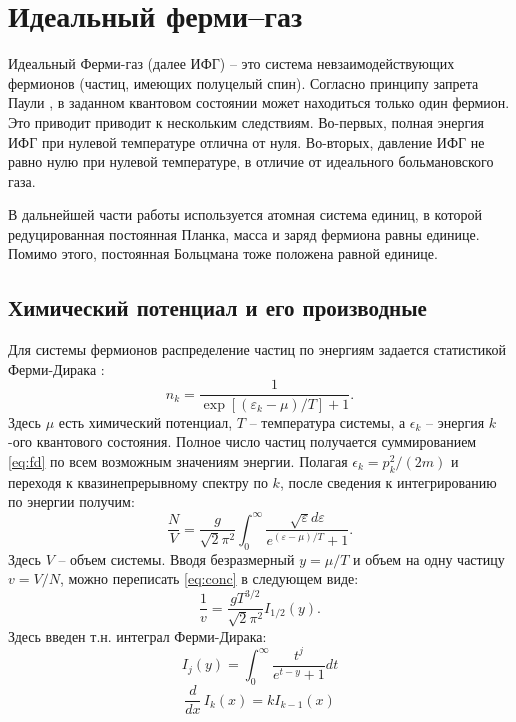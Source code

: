 \chapter{Идеальный ферми--газ}
Идеальный Ферми-газ (далее ИФГ) -- это система невзаимодействующих фермионов (частиц, имеющих полуцелый спин).
Согласно принципу запрета Паули \cite{Pauli:ZP:1925,Pauli:PR:1940}, в заданном квантовом состоянии может находиться только один фермион.
Это приводит приводит к нескольким следствиям.
Во-первых, полная энергия ИФГ при нулевой температуре отлична от нуля.
Во-вторых, давление ИФГ не равно нулю при нулевой температуре, в отличие от идеального больмановского газа.

В дальнейшей части работы используется атомная система единиц, в которой редуцированная постоянная Планка, масса и заряд фермиона равны единице.
Помимо этого, постоянная Больцмана тоже положена равной единице.

\section{Химический потенциал и его производные}
Для системы фермионов распределение частиц по энергиям задается статистикой Ферми-Дирака \cite{Landau:statmech:1958}:
\begin{equation}
    n_k = \frac{1}{\exp{[(\varepsilon_k - \mu)/T]} + 1}.
    \label{eq:fd}
\end{equation}
Здесь $\mu$ есть химический потенциал, $T$ -- температура системы, а $\epsilon_k$ -- энергия $k$-ого квантового состояния. 
Полное число частиц получается суммированием \eqref{eq:fd} по всем возможным значениям энергии.
Полагая $\epsilon_k = p^2_{k} / (2m)$ и переходя к квазинепрерывному спектру по $k$, после сведения к интегрированию по энергии получим:
\begin{equation}
    \label{eq:conc}
    \frac{N}{V}=\frac{g}{\sqrt{2} \pi^{2}} \int_{0}^{\infty} \frac{\sqrt{\varepsilon} d \varepsilon}{e^{(\varepsilon-\mu) / T}+1}.
\end{equation}
Здесь $V$ -- объем системы.
Вводя безразмерный $y = \mu / T$ и объем на одну частицу $v = V / N$, можно переписать \eqref{eq:conc} в следующем виде:
\begin{equation}
    \frac{1}{v} = \frac{g T^{3/2}}{\sqrt{2}\pi^2}I_{1/2}(y).
    \label{eq:mu_equation}
\end{equation}
Здесь введен т.н. интеграл Ферми-Дирака:
\begin{equation}
    \label{eq:fermi-dirak_integral_definition}
    I_{j}(y)= \int_{0}^{\infty} \frac{t^{j}}{e^{t-y}+1} dt
\end{equation}
\begin{equation}
    \label{eq:ifg_diff_rule}
    \frac{d}{dx}\, I_k (x) = k I _{k-1} (x)
\end{equation}

